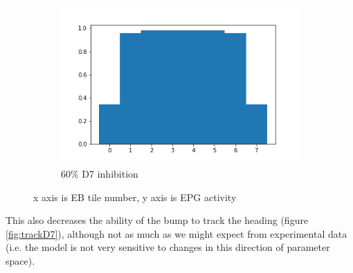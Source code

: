 \documentclass{article}
\begin{document}
\begin{figure}[h]
\begin{subfigure}[t]{0.32\linewidth}
		\includegraphics[width = 1.0\linewidth, trim={20 20 20 20}, clip=true]{../figures/D7_inhib_04.png}
		\caption{60\% D7 inhibition}
		\label{fig:dist60}
	\end{subfigure}
\caption{x axis is EB tile number, y axis is EPG activity}
\label{fig:D7dist}
\end{figure}

\newpage

This also decreases the ability of the bump to track the heading (figure \ref{fig:trackD7}), although not as much as we might expect from experimental data (i.e. the model is not very sensitive to changes in this direction of parameter space).
\end{document}
